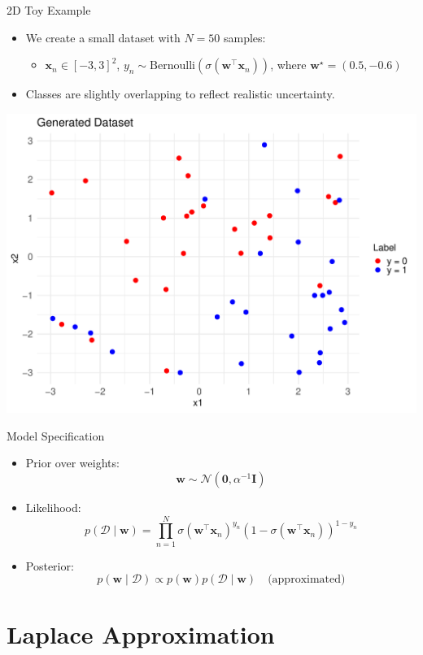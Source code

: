 \documentclass{beamer}
\begin{document}
\begin{frame}{2D Toy Example}
\begin{itemize}
  \item We create a small dataset with $N=50$ samples:
  \begin{itemize}
    \item $\mathbf{x}_n \in [-3, 3]^2$, $y_n \sim \mathrm{Bernoulli}(\sigma(\mathbf{w}^\top \mathbf{x}_n))$, where $\mathbf{w}^\star = (0.5, -0.6)$
  \end{itemize}
  \item Classes are slightly overlapping to reflect realistic uncertainty.
\end{itemize}

\vspace{0.5em}
\begin{center}
  \includegraphics[width=0.6\linewidth]{generated_dataset.pdf}
\end{center}
\end{frame}

\begin{frame}{Model Specification}
\begin{itemize}
  \item Prior over weights:
  \[
    \mathbf{w} \sim \mathcal{N}(\mathbf{0}, \alpha^{-1} \mathbf{I})
  \]
  \item Likelihood:
  \[
    p(\mathcal{D} \mid \mathbf{w}) = \prod_{n=1}^{N} \sigma(\mathbf{w}^\top \mathbf{x}_n)^{y_n} (1 - \sigma(\mathbf{w}^\top \mathbf{x}_n))^{1 - y_n}
  \]
  \item Posterior:
  \[
    p(\mathbf{w} \mid \mathcal{D}) \propto p(\mathbf{w}) p(\mathcal{D} \mid \mathbf{w}) \quad \text{(approximated)}
  \]
\end{itemize}
\end{frame}

\section{Laplace Approximation}
\end{document}
